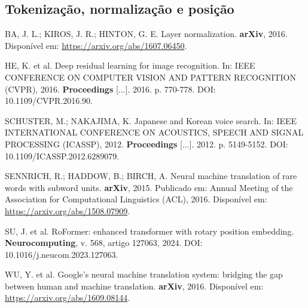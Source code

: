 \documentclass[11pt,a4paper]{article}
\begin{document}
\subsection{Tokenização, normalização e posição}
BA, J. L.; KIROS, J. R.; HINTON, G. E. Layer normalization. \textbf{arXiv}, 2016. Disponível em: \url{https://arxiv.org/abs/1607.06450}.\par
HE, K. et al. Deep residual learning for image recognition. In: IEEE CONFERENCE ON COMPUTER VISION AND PATTERN RECOGNITION (CVPR), 2016. \textbf{Proceedings} [...]. 2016. p. 770-778. DOI: 10.1109/CVPR.2016.90.\par
SCHUSTER, M.; NAKAJIMA, K. Japanese and Korean voice search. In: IEEE INTERNATIONAL CONFERENCE ON ACOUSTICS, SPEECH AND SIGNAL PROCESSING (ICASSP), 2012. \textbf{Proceedings} [...]. 2012. p. 5149-5152. DOI: 10.1109/ICASSP.2012.6289079.\par
SENNRICH, R.; HADDOW, B.; BIRCH, A. Neural machine translation of rare words with subword units. \textbf{arXiv}, 2015. Publicado em: Annual Meeting of the Association for Computational Linguistics (ACL), 2016. Disponível em: \url{https://arxiv.org/abs/1508.07909}.\par
SU, J. et al. RoFormer: enhanced transformer with rotary position embedding. \textbf{Neurocomputing}, v. 568, artigo 127063, 2024. DOI: 10.1016/j.neucom.2023.127063.\par
WU, Y. et al. Google's neural machine translation system: bridging the gap between human and machine translation. \textbf{arXiv}, 2016. Disponível em: \url{https://arxiv.org/abs/1609.08144}.\par
\end{document}
